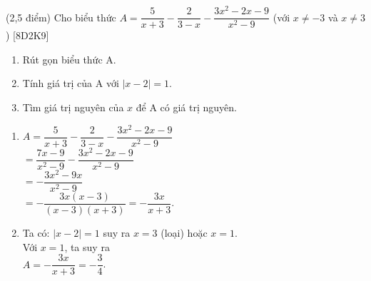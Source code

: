 \documentclass[12pt,a4paper,oneside]{book}
\begin{document}
\begin{ex} (2,5 điểm) 
	Cho biểu thức $A=\dfrac{5}{x+3}-\dfrac{2}{3-x}-\dfrac{3{{x}^{2}}-2x-9}{{{x}^{2}}-9}$  (với $x\ne -3$ và $x\ne 3$) [8D2K9]
       \begin{enumerate}
        \item Rút gọn biểu thức A. 
        \item Tính giá trị của A với $\left| x-2 \right|=1$.
        \item Tìm giá trị nguyên của $x$ để A có giá trị nguyên. 

    \end{enumerate}
\loigiai
    {
\begin{enumerate}
  \item $A=\dfrac{5}{x+3}-\dfrac{2}{3-x}-\dfrac{3{{x}^{2}}-2x-9}{{{x}^{2}}-9}$\\
  $=\dfrac{7x-9}{{{x}^{2}}-9}-\dfrac{3{{x}^{2}}-2x-9}{{{x}^{2}}-9}$\\
  $=-\dfrac{3{{x}^{2}}-9x}{{{x}^{2}}-9}$\\
  $=-\dfrac{3x\left( x-3 \right)}{\left( x-3 \right)\left( x+3 \right)}=-\dfrac{3x}{x+3}$.
 \item Ta có: $\left| x-2 \right|=1$ suy ra $x=3$ (loại) hoặc $x=1$.\\
 Với $x=1$, ta suy ra\\
 $A=-\dfrac{3x}{x+3}=-\dfrac{3}{4}$.

 \end{enumerate}
    }
\end{ex}
\end{document}
